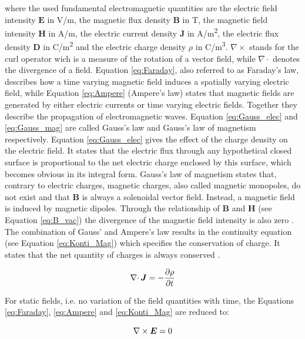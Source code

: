 where the used fundamental electromagnetic quantities are the electric field intensity $\boldsymbol{E}$ in V/m, the magnetic flux density $\boldsymbol{B}$ in T, the magnetic field intensity $\boldsymbol{H}$ in A/m, the electric current density $\boldsymbol{J}$ in A/m\textsuperscript{2}, the electric flux density $\boldsymbol{D}$ in C/m\textsuperscript{2} and the electric charge density $\rho$ in C/m\textsuperscript{3}. $\nabla\times$ stands for the curl operator wich is a measure of the rotation of a vector field, while $\nabla\cdotp$ denotes the divergence of a field. Equation \ref{eq:Faraday}, also referred to as Faraday's law, describes how a time varying magnetic field induces a spatially varying electric field, while Equation \ref{eq:Ampere} (Ampere's law) states that magnetic fields are generated by either electric currents or time varying electric fields. Together they describe the propagation of electromagnetic waves. Equation \ref{eq:Gauss_elec} and \ref{eq:Gauss_mag} are called Gauss's law and Gauss's law of magnetism respectively. Equation \ref{eq:Gauss_elec} gives the effect of the charge density on the electric field. It states that the electric flux through any hypothetical closed surface is proportional to the net electric charge enclosed by this surface, which becomes obvious in its integral form. Gauss's law of magnetism states that, contrary to electric charges, magnetic charges, also called magnetic monopoles, do not exist and that $\boldsymbol{B}$ is always a solenoidal vector field. Instead, a magnetic field is induced by magnetic dipoles. Through the relationship of $\boldsymbol{B}$ and $\boldsymbol{H}$ (see Equation \ref{eq:B_vac}) the divergence of the magnetic field intensity is also zero \cite{monk2003finite,kallenbach2018elektromagnete}.
The combination of Gauss' and Ampere's law results in the continuity equation (see Equation \ref{eq:Konti_Mag}) which specifies the conservation of charge. It states that the net quantity of charges is always conserved \cite{monk2003finite,meschede2015gerthsen,schwab2013begriffswelt}.   

\begin{equation}
\label{eq:Konti_Mag}
\centering
\nabla\cdotp\boldsymbol{J} = -\frac{\partial\rho}{\partial t}
\end{equation}

For static fields, i.e. no variation of the field quantities with time, the Equations \ref{eq:Faraday}, \ref{eq:Ampere} and \ref{eq:Konti_Mag} are reduced to:

\begin{equation}
\label{eq:Faraday_stat}
\centering
\nabla\times\boldsymbol{E} = 0
\end{equation}

